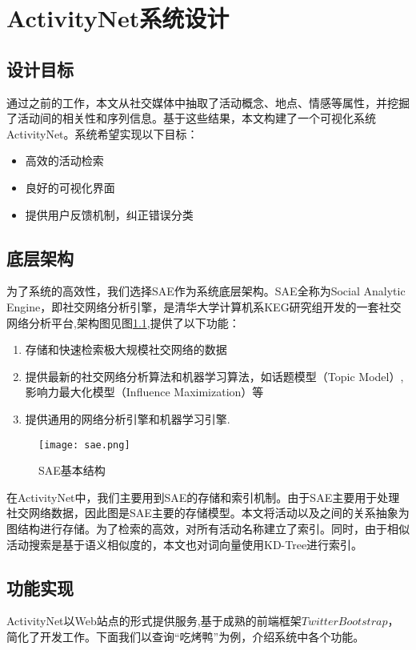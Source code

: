 \chapter{ActivityNet系统设计}

\section{设计目标}
通过之前的工作，本文从社交媒体中抽取了活动概念、地点、情感等属性，并挖掘了活动间的相关性和序列信息。基于这些结果，本文构建了一个可视化系统ActivityNet。系统希望实现以下目标：
\begin{itemize}
\item 高效的活动检索
\item 良好的可视化界面
\item 提供用户反馈机制，纠正错误分类
\end{itemize}

\section{底层架构}
为了系统的高效性，我们选择SAE作为系统底层架构。SAE全称为Social Analytic Engine，即社交网络分析引擎，是清华大学计算机系KEG研究组开发的一套社交网络分析平台,架构图见图\ref{fig:sae_arch},提供了以下功能：
\begin{enumerate}
\item 存储和快速检索极大规模社交网络的数据
\item 提供最新的社交网络分析算法和机器学习算法，如话题模型（Topic Model）, 影响力最大化模型（Influence Maximization）等
\item 提供通用的网络分析引擎和机器学习引擎.
\end{enumerate}

\begin{figure}[!h]
\centering
\texttt{[image: sae.png]}
\caption{SAE基本结构}
\label{fig:sae_arch}
\end{figure}

在ActivityNet中，我们主要用到SAE的存储和索引机制。由于SAE主要用于处理社交网络数据，因此图是SAE主要的存储模型。本文将活动以及之间的关系抽象为图结构进行存储。为了检索的高效，对所有活动名称建立了索引。同时，由于相似活动搜索是基于语义相似度的，本文也对词向量使用KD-Tree进行索引。

\section{功能实现}
ActivityNet以Web站点的形式提供服务,基于成熟的前端框架$Twitter Bootstrap$，简化了开发工作。下面我们以查询``吃烤鸭''为例，介绍系统中各个功能。

